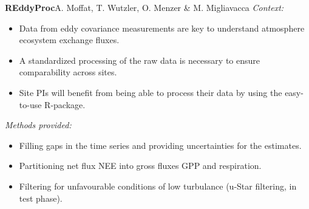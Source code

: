 
\begin{columns}
\begin{column}{.48\textwidth}
\begin{center}
\begin{minipage}[T]{.95\textwidth}
\parbox[t][\columnheight]{\textwidth}{

\begin{block}{\vspace{.2cm}\textbf{REddyProc}\hfill\normalsize{A. Moffat, T. Wutzler, O. Menzer \& M. Migliavacca}}
\alert{\textit{Context:}}

\begin{itemize}
    \item Data from eddy covariance measurements are key to understand atmosphere ecosystem exchange fluxes.
    \item A standardized processing of the raw data is necessary to ensure comparability across sites.
    \item Site PIs will benefit from being able to process their data by using the easy-to-use R-package.
\end{itemize}
 
\alert{\textit{Methods provided:}}
\begin{itemize}
    \item Filling gaps in the time series and providing uncertainties for the estimates.
    \item Partitioning net flux NEE into gross fluxes GPP and respiration.
    \item Filtering for unfavourable conditions of low turbulance (u-Star filtering, in test phase).
\end{itemize}
\vspace{1cm}


\end{block}}
\end{minipage}
\end{center}
\end{column}
\end{columns}
